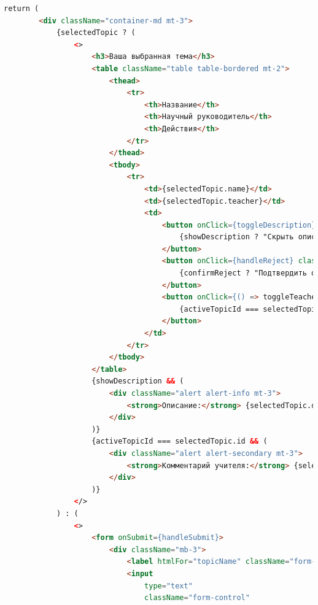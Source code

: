 \documentclass[14pt]{extarticle} %
\begin{document}
\begin{lstlisting}[language=html, caption={Клиентская часть SuggestTopic}]
    return (
        <div className="container-md mt-3">
            {selectedTopic ? (
                <>
                    <h3>Ваша выбранная тема</h3>
                    <table className="table table-bordered mt-2">
                        <thead>
                            <tr>
                                <th>Название</th>
                                <th>Научный руководитель</th>
                                <th>Действия</th>
                            </tr>
                        </thead>
                        <tbody>
                            <tr>
                                <td>{selectedTopic.name}</td>
                                <td>{selectedTopic.teacher}</td>
                                <td>
                                    <button onClick={toggleDescription} className="btn btn-info">
                                        {showDescription ? "Скрыть описание" : "Подробнее"}
                                    </button>
                                    <button onClick={handleReject} className={`btn ${confirmReject ? "btn-danger" : "btn-warning"} ms-2`}>
                                        {confirmReject ? "Подтвердить отказ" : "Отказаться от темы"}
                                    </button>
                                    <button onClick={() => toggleTeacherComment(selectedTopic.id)} className="btn btn-secondary ms-2">
                                        {activeTopicId === selectedTopic.id ? "Скрыть комментарий" : "Комментарий учителя"}
                                    </button>
                                </td>
                            </tr>
                        </tbody>
                    </table>
                    {showDescription && (
                        <div className="alert alert-info mt-3">
                            <strong>Описание:</strong> {selectedTopic.description}
                        </div>
                    )}
                    {activeTopicId === selectedTopic.id && (
                        <div className="alert alert-secondary mt-3">
                            <strong>Комментарий учителя:</strong> {selectedTopic.comment || 'Нет комментария'}
                        </div>
                    )}
                </>
            ) : (
                <>
                    <form onSubmit={handleSubmit}>
                        <div className="mb-3">
                            <label htmlFor="topicName" className="form-label">Название темы</label>
                            <input
                                type="text"
                                className="form-control"

\end{lstlisting}
\end{document}
